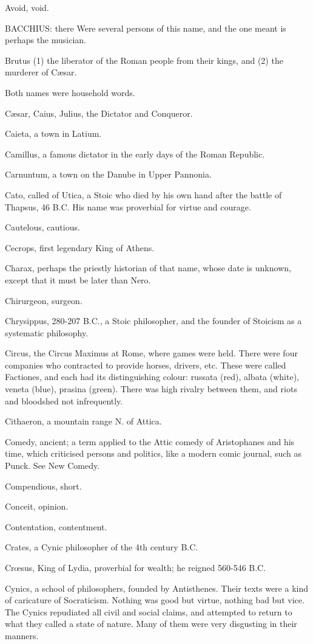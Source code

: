 Avoid, void.

BACCHIUS: there Were several persons of this name, and the one meant is
perhaps the musician.

Brutus (1) the liberator of the Roman people from their kings, and (2) the
murderer of Cæsar.

Both names were household words.

Cæsar, Caius, Julius, the Dictator and Conqueror.

Caieta, a town in Latium.

Camillus, a famous dictator in the early days of the Roman Republic.

Carnuntum, a town on the Danube in Upper Pannonia.

Cato, called of Utica, a Stoic who died by his own hand after the battle
of Thapsus, 46 B.C. His name was proverbial for virtue and courage.

Cautelous, cautious.

Cecrops, first legendary King of Athens.

Charax, perhaps the priestly historian of that name, whose date is
unknown, except that it must be later than Nero.

Chirurgeon, surgeon.

Chrysippus, 280-207 B.C., a Stoic philosopher, and the founder of Stoicism
as a systematic philosophy.

Circus, the Circus Maximus at Rome, where games were held. There were four
companies who contracted to provide horses, drivers, etc. These were
called Factiones, and each had its distinguishing colour: russata (red),
albata (white), veneta (blue), prasina (green). There was high rivalry
between them, and riots and bloodshed not infrequently.

Cithaeron, a mountain range N. of Attica.

Comedy, ancient; a term applied to the Attic comedy of Aristophanes and
his time, which criticised persons and politics, like a modern comic
journal, such as Punck. See New Comedy.

Compendious, short.

Conceit, opinion.

Contentation, contentment.

Crates, a Cynic philosopher of the 4th century B.C.

Crœsus, King of Lydia, proverbial for wealth; he reigned 560-546 B.C.

Cynics, a school of philosophers, founded by Antisthenes. Their texts were
a kind of caricature of Socraticism. Nothing was good but virtue, nothing
bad but vice. The Cynics repudiated all civil and social claims, and
attempted to return to what they called a state of nature. Many of them
were very disgusting in their manners.

